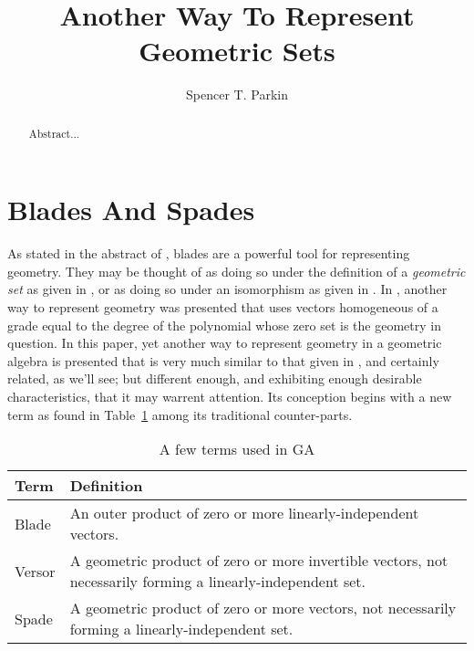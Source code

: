 \documentclass{birkjour}
\theoremstyle{definition}
\theoremstyle{remark}
\numberwithin{equation}{section}
\begin{document}
\title{Another Way To Represent Geometric Sets}

\author{Spencer T. Parkin}



\begin{abstract}
Abstract...
\end{abstract}


\maketitle

\section{Blades And Spades}

As stated in the abstract of \cite{Fontijne10}, blades are a powerful tool for representing geometry.
They may be thought of as doing so under the definition of a \emph{geometric set} as given in \cite{Parkin15}, or as
doing so under an isomorphism as given in \cite{Hestenes01}.  In \cite{Parkin13}, another way
to represent geometry was presented that uses vectors homogeneous of a grade equal to the degree
of the polynomial whose zero set is the geometry in question.  In this paper, yet another way to represent
geometry in a geometric algebra is presented that is very much similar to that given in \cite{Parkin15,Hestenes01,Dorst07},
and certainly related, as we'll see; but different enough, and exhibiting enough desirable characteristics, that it may warrent attention.  Its conception begins with
a new term as found in Table~\ref{tbl_terms} among its traditional counter-parts.

\begin{table}[H]\label{tbl_terms}\caption{A few terms used in GA}
\begin{tabular}{p{1cm}p{9cm}}
Term & Definition \\
\hline
Blade & An outer product of zero or more linearly-independent vectors. \\
Versor & A geometric product of zero or more invertible vectors, not necessarily forming a linearly-independent set. \\
Spade & A geometric product of zero or more vectors, not necessarily forming a linearly-independent set.
\end{tabular}
\end{table}
\end{document}
